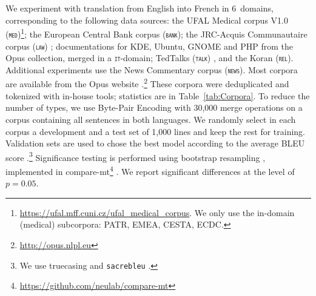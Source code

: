 \documentclass[11pt]{article}
\newcommand{\fyDone}[1]{\done[FY]\Todo[FY:]{\textcolor{orange}{#1}}}
\newcommand{\domain}[1]{\texttt{\textsc{#1}}}
\begin{document}
We experiment with translation from English into French in 6~domains, corresponding to the following data sources: the UFAL Medical corpus V1.0 (\domain{med})\footnote{\url{https://ufal.mff.cuni.cz/ufal_medical_corpus}. We only use the in-domain (medical) subcorpora: PATR, EMEA, CESTA, ECDC.}; the European Central Bank corpus (\domain{bank}); the JRC-Acquis Communautaire corpus (\domain{law}) \cite{Steinberger06acquis}; documentations for KDE, Ubuntu, GNOME and PHP from the Opus collection, merged in a \domain{it}-domain; TedTalks (\domain{talk}) \cite{Cettolo12wit}, and the Koran (\domain{rel}). Additional experiments use the News Commentary corpus (\domain{news}). Most corpora are available from the Opus website \cite{Tiedeman12parallel}.\footnote{\url{http://opus.nlpl.eu}} These corpora were deduplicated and tokenized with in-house tools; statistics are in Table~\ref{tab:Corpora}. To reduce the number of types, we use Byte-Pair Encoding \cite{Sennrich16BPE} with 30,000 merge operations on a corpus containing all sentences in both languages.\fyDone{Add \# number of tokens, also specificity ?}%
%
We randomly select in each corpus a development and a test set of 1,000 lines and keep the rest for training. Validation sets are used to chose the best model according to the average BLEU score \cite{Papineni02bleu}.\footnote{We use truecasing and \texttt{sacrebleu} \cite{Post18call}.}\fyDone{A word about meta-parameter settings} Significance testing is performed using bootstrap resampling \cite{Koehn04statistical}, implemented in compare-mt\footnote{\url{https://github.com/neulab/compare-mt}} \cite{Neubig19compare-mt}. We report significant differences at the level of $p=0.05$.\fyDone{Fix correct p value}
\end{document}
